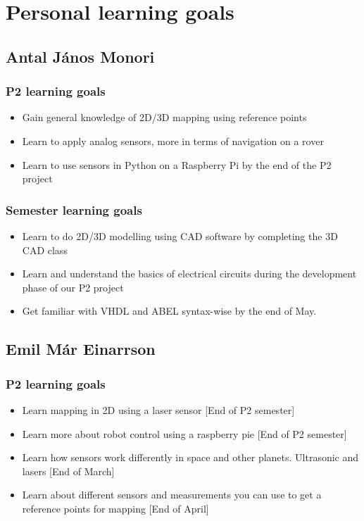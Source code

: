 \section{Personal learning goals}\label{appendix:personal-learning-goals}

\subsection{Antal János Monori}
\subsubsection{P2 learning goals}
\begin{itemize}
	\item Gain general knowledge of 2D/3D mapping using reference points
	\item Learn to apply analog sensors, more in terms of navigation on a rover
	\item Learn to use sensors in Python on a Raspberry Pi by the end of the P2 project
\end{itemize}
\subsubsection{Semester learning goals}
\begin{itemize}
	\item Learn to do 2D/3D modelling using CAD software by completing the 3D CAD class
	\item Learn and understand the basics of electrical circuits during the development phase of our P2 project
	\item Get familiar with VHDL and ABEL syntax-wise by the end of May.
\end{itemize}

\subsection{Emil Már Einarrson}
\subsubsection{P2 learning goals}
\begin{itemize}
	\item Learn mapping in 2D using a laser sensor [End of P2 semester]
	\item Learn more about robot control using a raspberry pie [End of P2 semester]
	\item Learn how sensors work differently in space and other planets. Ultrasonic and lasers [End of March]
	\item Learn about different sensors and measurements you can use to get a reference points for mapping [End of April]
\end{itemize}
